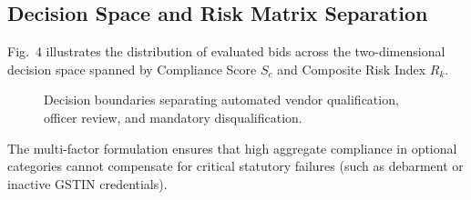 \documentclass[conference]{IEEEtran}
\begin{document}
\subsection{Decision Space and Risk Matrix Separation}
Fig.~4 illustrates the distribution of evaluated bids across the two-dimensional decision space spanned by Compliance Score $S_c$ and Composite Risk Index $R_k$.

\begin{figure}[!ht]
\centering
{}
\caption{Decision boundaries separating automated vendor qualification, officer review, and mandatory disqualification.}
\label{fig:frontier}
\end{figure}

The multi-factor formulation ensures that high aggregate compliance in optional categories cannot compensate for critical statutory failures (such as debarment or inactive GSTIN credentials).
\end{document}
